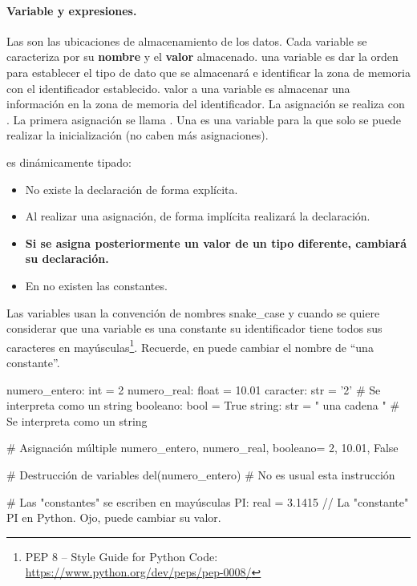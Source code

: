 \paragraph{Variable y expresiones.}
Las  son las ubicaciones de almacenamiento de los datos. 
Cada variable se caracteriza por su \textbf{nombre} y el \textbf{valor} almacenado.
 una variable es dar la orden para establecer el tipo de dato que se almacenará  e identificar la zona de memoria con el identificador establecido.
 valor a una variable es almacenar una información en la zona de memoria del identificador. La asignación se realiza con \cm{=}.
La primera asignación se llama .
Una  es una variable para la que solo se puede realizar la inicialización (no caben más asignaciones).


 es dinámicamente tipado:
	\begin{itemize}
	\item No existe la declaración de forma explícita.
	\item Al realizar una asignación, de forma implícita realizará la declaración.
	\item \textbf{Si se asigna posteriormente un valor de un tipo diferente, cambiará su declaración.}
	\item En  no existen las constantes.
	\end{itemize}



Las variables usan la convención de nombres snake\_case   y cuando se quiere considerar que una variable es una constante su identificador tiene todos sus caracteres en mayúsculas\footnote{PEP 8 -- Style Guide for Python Code: \url{https://www.python.org/dev/peps/pep-0008/}}. Recuerde, en  puede cambiar el nombre de ``una constante''.

\begin{pyverbatim}[][frame=single]
numero_entero: int = 2
numero_real: float = 10.01
caracter: str = '2'             # Se interpreta como un string
booleano: bool = True
string: str = " una cadena "    # Se interpreta como un string

# Asignación múltiple
numero_entero, numero_real, booleano= 2, 10.01, False

# Destrucción de variables
del(numero_entero)   # No es usual esta instrucción

# Las "constantes" se escriben en mayúsculas
PI: real = 3.1415      // La "constante" PI en Python. Ojo, puede cambiar su valor.
\end{pyverbatim}




